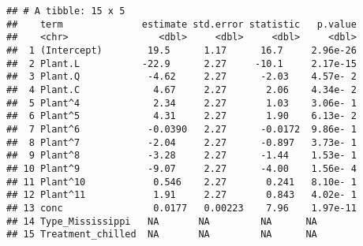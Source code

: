 \documentclass[
]{book}
\begin{document}
\begin{verbatim}
## # A tibble: 15 x 5
##    term              estimate std.error statistic   p.value
##    <chr>                <dbl>     <dbl>     <dbl>     <dbl>
##  1 (Intercept)        19.5      1.17      16.7     2.96e-26
##  2 Plant.L           -22.9      2.27     -10.1     2.17e-15
##  3 Plant.Q            -4.62     2.27      -2.03    4.57e- 2
##  4 Plant.C             4.67     2.27       2.06    4.34e- 2
##  5 Plant^4             2.34     2.27       1.03    3.06e- 1
##  6 Plant^5             4.31     2.27       1.90    6.13e- 2
##  7 Plant^6            -0.0390   2.27      -0.0172  9.86e- 1
##  8 Plant^7            -2.04     2.27      -0.897   3.73e- 1
##  9 Plant^8            -3.28     2.27      -1.44    1.53e- 1
## 10 Plant^9            -9.07     2.27      -4.00    1.56e- 4
## 11 Plant^10            0.546    2.27       0.241   8.10e- 1
## 12 Plant^11            1.91     2.27       0.843   4.02e- 1
## 13 conc                0.0177   0.00223    7.96    1.97e-11
## 14 Type_Mississippi   NA       NA         NA      NA       
## 15 Treatment_chilled  NA       NA         NA      NA
\end{verbatim}

\printbibliography
\end{document}
